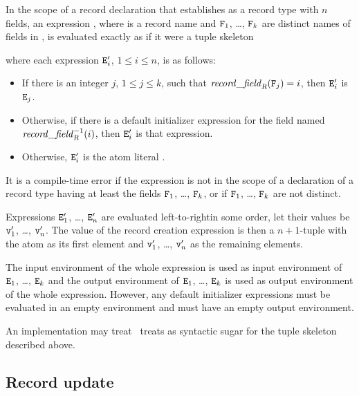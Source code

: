In the scope of a record declaration that establishes  as
a record type with $n$ fields, an expression
,
where  is a record name and ${\tt{\sl F}}_1$, \ldots, ${\tt{\sl F}}_k$ are
distinct names of fields in , is evaluated exactly as if it
were a tuple skeleton
\begin{textdisplay}
\end{textdisplay}
where each expression ${\tt{\sl E}}'_i$, $1\leq i\leq n$, is as follows:
\begin{itemize}
\item If there is an integer
$j$, $1\leq j\leq k$, such that $\mathit{record\_field}_{\mbox{\scriptsize\tt{\sl{R}}}}({\tt{\sl F}}_j)=i$,
then ${\tt{\sl E}}'_i$ is ${\tt{\sl E}}_j$.
\item Otherwise, if there is a default initializer expression for
the field named $\mathit{record\_field}_{\mbox{\scriptsize\tt{\sl{R}}}}^{-1}(i)$, then
${\tt{\sl E}}'_i$ is that expression.
\item Otherwise, ${\tt{\sl E}}'_i$ is the atom literal .
\end{itemize}
It is a compile-time error if the expression is not in the scope of
a declaration of a record type  having at least the fields
${\tt{\sl F}}_1$, \ldots, ${\tt{\sl F}}_k$, or if ${\tt{\sl F}}_1$, \ldots, ${\tt{\sl F}}_k$
are not distinct.

Expressions ${\tt{\sl E}}'_1$, \ldots, ${\tt{\sl E}}'_n$ are evaluated
\ifStd left-to-right\fi \ifOld in some order\fi,
let their values be ${\tt{\sl v}}'_1$, \ldots, ${\tt{\sl v}}'_n$.  The value
of the record creation expression is then a $n+1$-tuple with
the atom  as its first element and ${\tt{\sl v}}'_1$, \ldots, ${\tt{\sl v}}'_n$
as the remaining elements.

\ENVIRONMENTS

The input environment of the whole expression is used as input environment
of ${\tt{\sl E}}_1$, \ldots, ${\tt{\sl E}}_k$ and the output environment of
${\tt{\sl E}}_1$, \ldots, ${\tt{\sl E}}_k$ is used as output environment of the
whole expression.  However, any default initializer expressions
must be evaluated in an empty environment and must have an empty
output environment.

\NOTE

\ifStd An implementation may treat \fi
\ifOld \OldErlang\ treats \fi
{}
as syntactic sugar for the tuple skeleton described above.

\subsection{Record update}

